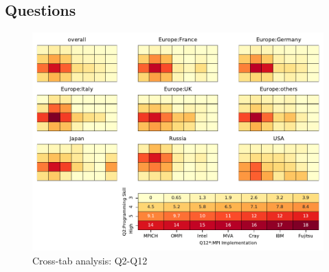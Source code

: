 
\subsection{Questions}


\begin{figure}
\begin{center}
\includegraphics[width=12cm]{../pdfs/Q2-Q12.pdf}
\caption{Cross-tab analysis: Q2-Q12}
\label{fig:Q2-Q12}
\end{center}
\end{figure}
